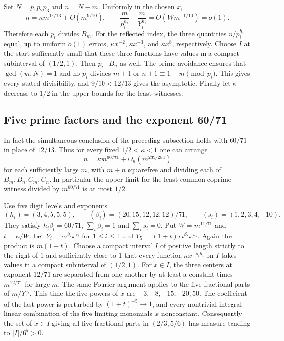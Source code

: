 \documentclass[11pt,a4paper]{article}
\numberwithin{equation}{section}
\begin{document}
Set $N=p_1p_2p_3$ and $n=N-m$. Uniformly in the chosen $x$,
\[
 n=\kappa m^{12/13}+O(m^{9/10}),\qquad
 \frac{m}{p_i^{h_i}}-\frac{m}{Y_i^{h_i}}
       =O(Wm^{-1/10})=o(1).
\]
Therefore each $p_i$ divides $B_m$. For the reflected index, the
three quantities $n/p_i^{h_i}$ equal, up to uniform $o(1)$ errors,
$\kappa x^{-2}$, $\kappa x^{-3}$, and $\kappa x^8$, respectively.
Choose $I$ at the start sufficiently small that these three functions
have values in a compact subinterval of $(1/2,1)$.
Then $p_i\mid B_n$ as well. The prime avoidance ensures that
$\gcd(m,N)=1$ and no $p_i$ divides $m+1$ or $n+1\equiv1-m\pmod{p_i}$.
This gives every stated divisibility, and $9/10<12/13$ gives the
asymptotic. Finally let $\kappa$ decrease to $1/2$ in the upper
bounds for the least witnesses.

\subsection{Five prime factors and the exponent 60/71}

In fact the simultaneous conclusion of the preceding subsection holds
with $60/71$ in place of $12/13$. Thus for every fixed
$1/2<\kappa<1$ one can arrange
\[
 n=\kappa m^{60/71}+O_\kappa(m^{239/284})
\]
for each sufficiently large $m$, with $m+n$ squarefree and dividing
each of $B_m,B_n,C_m,C_n$. In particular the upper limit for the
least common coprime witness divided by $m^{60/71}$ is at most $1/2$.

Use five digit levels and exponents
\[
 (h_i)=(3,4,5,5,5),\qquad
 (\beta_i)=(20,15,12,12,12)/71,\qquad
 (s_i)=(1,2,3,4,-10).
\]
They satisfy $h_i\beta_i=60/71$, $\sum_i\beta_i=1$ and
$\sum_i s_i=0$. Put $W=m^{11/71}$ and $t=\kappa/W$.
Let $Y_i=m^{\beta_i}x^{s_i}$ for $1\le i\le4$ and
$Y_5=(1+t)m^{\beta_5}x^{s_5}$. Again the product is $m(1+t)$.
Choose a compact interval $I$ of positive length strictly to the
right of $1$ and sufficiently close to $1$ that every function
$\kappa x^{-s_i h_i}$ on $I$ takes values in a compact subinterval
of $(1/2,1)$. For $x\in I$, the three centers at exponent $12/71$
are separated from one another by at least a constant times
$m^{12/71}$ for large $m$.
The same Fourier argument applies to the five fractional parts
of $m/Y_i^{h_i}$. This time the five powers of $x$ are
$-3,-8,-15,-20,50$. The coefficient of the last power is perturbed
by $(1+t)^{-5}\to1$, and every nontrivial integral linear combination
of the five limiting monomials is nonconstant. Consequently the set
of $x\in I$ giving all five fractional parts in $(2/3,5/6)$ has
measure tending to $|I|/6^5>0$.
\end{document}
